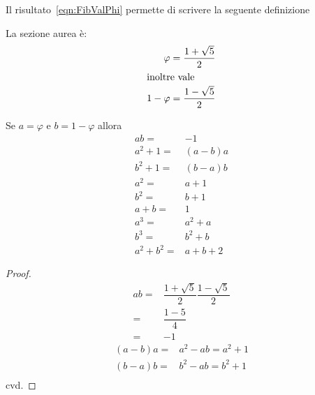 Il risultato~\ref{eqn:FibValPhi} permette di scrivere la seguente definizione
\begin{defn}
La sezione aurea è: 
\begin{align*}
	\varphi={}&\dfrac{1+\sqrt{5}}{2}\\
\intertext{inoltre vale}
	1-	\varphi={}&\dfrac{1-\sqrt{5}}{2}\\
\end{align*}
\end{defn}
\begin{lem}[Proprietà]\label{lem:FibpropPhi}
	Se $a=\varphi$ e  $b=1-\varphi$ allora
	\begin{align*}
		ab={}&-1\\
		a^2+1={}&(a-b)a\\
		b^2+1={}&(b-a)b\\
		a^2={}&a+1\\
		b^2={}&b+1\\
		a+b={}&1\\
		a^3={}&a^2+a\\
		b^3={}&b^2+b\\
		a^2+b^2={}&a+b+2
	\end{align*}
\end{lem}
\begin{proof}
	\begin{align*}
		ab={}&\dfrac{1+\sqrt{5}}{2}\dfrac{1-\sqrt{5}}{2}\\
		={}&\dfrac{1-5}{4}\\
		={}&-1
	\end{align*}
	\begin{align*}
		(a-b)a={}&a^2-ab=a^2+1\\
		(b-a)b={}&b^2-ab=b^2+1\\
	\end{align*}
	cvd.
\end{proof}
